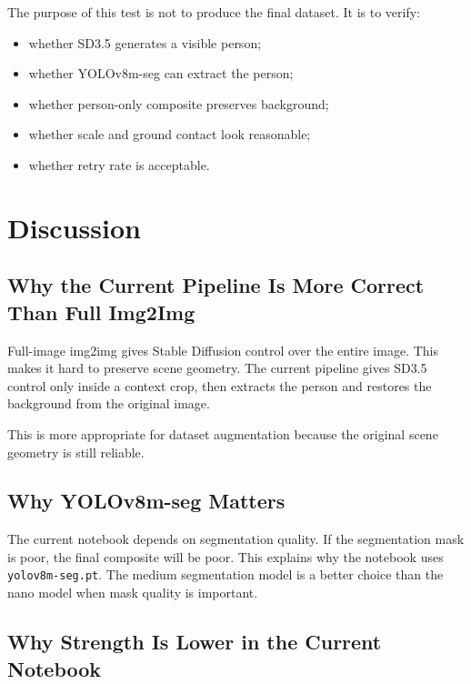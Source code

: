 \documentclass[12pt,a4paper]{article}
\begin{document}
The purpose of this test is not to produce the final dataset. It is to verify:

\begin{itemize}
    \item whether SD3.5 generates a visible person;
    \item whether YOLOv8m-seg can extract the person;
    \item whether person-only composite preserves background;
    \item whether scale and ground contact look reasonable;
    \item whether retry rate is acceptable.
\end{itemize}

\section{Discussion}

\subsection{Why the Current Pipeline Is More Correct Than Full Img2Img}

Full-image img2img gives Stable Diffusion control over the entire image. This
makes it hard to preserve scene geometry. The current pipeline gives SD3.5
control only inside a context crop, then extracts the person and restores the
background from the original image.

This is more appropriate for dataset augmentation because the original scene
geometry is still reliable.

\subsection{Why YOLOv8m-seg Matters}

The current notebook depends on segmentation quality. If the segmentation mask
is poor, the final composite will be poor. This explains why the notebook uses
\texttt{yolov8m-seg.pt}. The medium segmentation model is a better choice than
the nano model when mask quality is important.

\subsection{Why Strength Is Lower in the Current Notebook}
\end{document}
